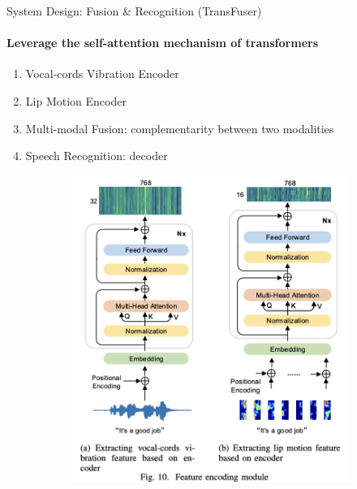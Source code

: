 \documentclass[dvipsnames, handout]{beamer}
\newcommand{\1}{\mathds{1}}	%
\begin{document}
\begin{frame}[t]{System Design: Fusion \& Recognition (TransFuser)}
\framesubtitle{Leverage the self-attention mechanism of transformers}

\begin{enumerate}
\item Vocal-cords Vibration Encoder
\item Lip Motion Encoder
\item Multi-modal Fusion: complementarity between two modalities
\item Speech Recognition: decoder
\end{enumerate}


\begin{figure}[ht]
\begin{subfigure}[b]{0.4\textwidth}
\includegraphics[width=\textwidth]{imgs/mmmic-fig10.png}
\end{subfigure}
\begin{subfigure}[b]{0.42\textwidth}

\end{subfigure}
\end{figure}
\end{frame}
\end{document}
